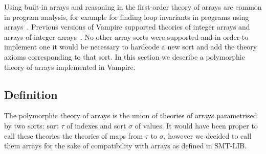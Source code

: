 Using built-in arrays and reasoning in the first-order theory of arrays are common in program analysis, for example for finding loop invariants in programs using arrays~\cite{fase2009}. Previous versions of Vampire supported theories of integer arrays and arrays of integer arrays~\cite{Vampire13}. No other array sorts were supported and in order to implement one it would be necessary to hardcode a new sort and add the theory axioms corresponding to that sort. In this section we describe a polymorphic theory of arrays implemented in Vampire.

\subsection{Definition}
The polymorphic theory of arrays is the union of theories of arrays parametrised by two sorts: sort $\tau$ of indexes and sort $\sigma$ of values. It would have been proper to call these theories the theories of maps from $\tau$ to $\sigma$, however we decided to call them arrays for the sake of compatibility with arrays as defined in SMT-LIB.

